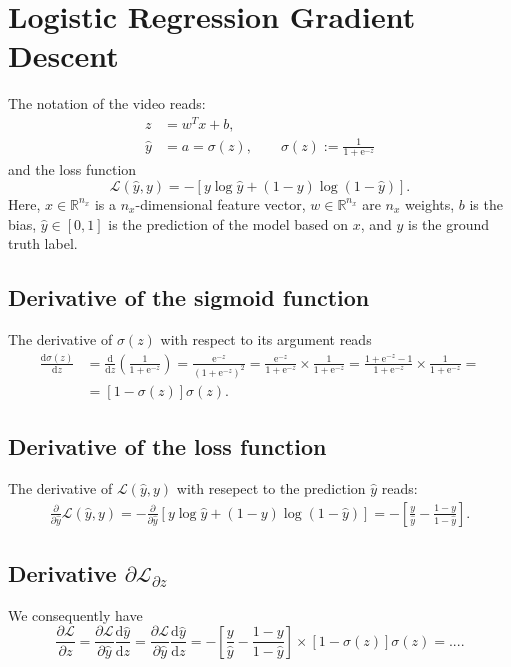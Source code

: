 \documentclass[a4paper,11pt]{article}
\newcommand{\of}[1]{\left( {#1} \right)}
\newcommand{\ofs}[1]{\left[ {#1} \right]}
\newcommand{\fracd}[2]{\frac{\dd{}{#1}}{\dd{}{#2}}}
\newcommand{\fracp}[2]{\frac{\partial{}{#1}}{\partial{}{#2}}}
\newcommand{\dd}{\text{d}}
\newcommand{\ee}{\text{e}}
\begin{document}
\section*{Logistic Regression Gradient Descent}
The notation of the video reads:
\[
\begin{split}
z & = w^T x + b,\\
\hat y &= a = \sigma\of{z}, \qquad \sigma\of{z} := \frac{1}{1 + \ee^{-z}}
\end{split}
\]
and the loss function
\[
\mathcal{L}\of{\hat{y}, y} = - \ofs{y \log\hat{y} + \of{1 - y} \log \of {1 - \hat{y}}}.
\]
Here, $x \in \mathbb{R}^{n_x}$ is a $n_x$-dimensional feature vector,
$w \in \mathbb{R}^{n_x}$ are $n_x$ weights, $b$ is the bias, $\hat{y}
\in [0, 1]$ is the prediction of the model based on $x$, and $y$ is
the ground truth label.

\subsection*{Derivative of the sigmoid function}
The derivative of $\sigma\of{z}$ with respect to its argument reads
\[
\begin{split}
\fracd{\sigma\of{z}}{z} &= \fracd{}{z}\of{\frac{1}{1 + \ee^{-z}}}
                        = \frac{\ee^{-z}}{\of{1 + \ee^{-z}}^2}
                        = \frac{\ee^{-z}}{1 + \ee^{-z}} \times \frac{1}{1 + \ee^{-z}}
                        = \frac{1 + \ee^{-z} - 1}{1 + \ee^{-z}} \times \frac{1}{1 + \ee^{-z}} =\\
                        &= \ofs{1 - \sigma\of{z}} \sigma\of{z}.
\end{split}
\]

\subsection*{Derivative of the loss function}
The derivative of $\mathcal{L}\of{\hat{y}, y}$ with resepect to the prediction $\hat{y}$ reads:
\[
\begin{split}
\fracp{}{\hat{y}} \mathcal{L}\of{\hat{y}, y} =
- \fracp{}{\hat{y}} \ofs{y \log\hat{y} + \of{1 - y} \log \of {1 - \hat{y}}} =
- \ofs{\frac{y}{\hat{y}} - \frac{1 - y}{1 - \hat{y}}}.
\end{split}
\]

\subsection*{Derivative $\partial\mathcal{L}_{\partial z}$}
We consequently have
\[
\fracp{\mathcal{L}}{z} =
\fracp{\mathcal{L}}{\hat{y}} \fracd{\hat{y}}{z} =
\fracp{\mathcal{L}}{\hat{y}} \fracd{\hat{y}}{z} =
- \ofs{\frac{y}{\hat{y}} - \frac{1 - y}{1 - \hat{y}}} \times \ofs{1 - \sigma\of{z}} \sigma\of{z} = ....
\]
\end{document}
